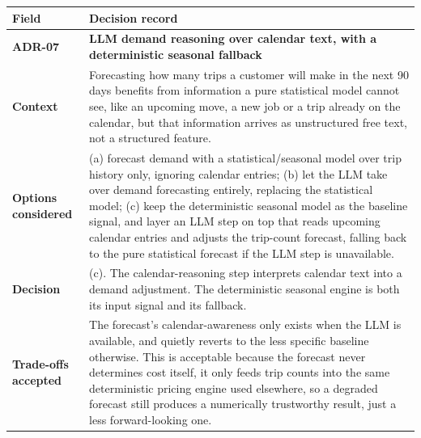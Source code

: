 \documentclass[
  11pt,
  a4paper,
  DIV=11,
  numbers=noendperiod,
  notitlepage]{scrreprt}
\newcounter{none} %
\begin{document}
{\def\LTcaptype{none} %
\begin{longtable}[]{@{}
  >{\raggedright\arraybackslash}p{}
  >{\raggedright\arraybackslash}p{}@{}}
\toprule\noalign{}
\begin{minipage}[b]{\linewidth}\raggedright
Field
\end{minipage} & \begin{minipage}[b]{\linewidth}\raggedright
Decision record
\end{minipage} \\
\midrule\noalign{}
\endhead
\bottomrule\noalign{}
\endlastfoot
\textbf{ADR-07} & \textbf{LLM demand reasoning over calendar text, with
a deterministic seasonal fallback} \\
\textbf{Context} & Forecasting how many trips a customer will make in
the next 90 days benefits from information a pure statistical model
cannot see, like an upcoming move, a new job or a trip already on the
calendar, but that information arrives as unstructured free text, not a
structured feature. \\
\textbf{Options considered} & (a) forecast demand with a
statistical/seasonal model over trip history only, ignoring calendar
entries; (b) let the LLM take over demand forecasting entirely,
replacing the statistical model; (c) keep the deterministic seasonal
model as the baseline signal, and layer an LLM step on top that reads
upcoming calendar entries and adjusts the trip-count forecast, falling
back to the pure statistical forecast if the LLM step is unavailable. \\
\textbf{Decision} & (c). The calendar-reasoning step interprets calendar
text into a demand adjustment. The deterministic seasonal engine is both
its input signal and its fallback. \\
\textbf{Trade-offs accepted} & The forecast's calendar-awareness only
exists when the LLM is available, and quietly reverts to the less
specific baseline otherwise. This is acceptable because the forecast
never determines cost itself, it only feeds trip counts into the same
deterministic pricing engine used elsewhere, so a degraded forecast
still produces a numerically trustworthy result, just a less
forward-looking one. \\
\end{longtable}
}
\end{document}
